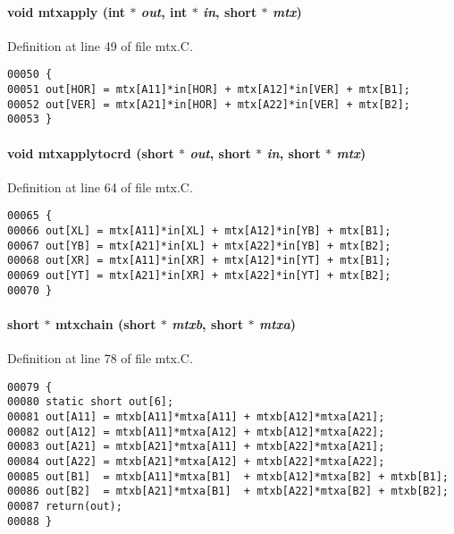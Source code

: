 \paragraph{\setlength{\rightskip}{0pt plus 5cm}void mtxapply (int $\ast$ {\em out}, int $\ast$ {\em in}, short $\ast$ {\em mtx})}\hfill



Definition at line 49 of file mtx.C.\small\begin{verbatim}00050 {
00051 out[HOR] = mtx[A11]*in[HOR] + mtx[A12]*in[VER] + mtx[B1];
00052 out[VER] = mtx[A21]*in[HOR] + mtx[A22]*in[VER] + mtx[B2];
00053 }
\end{verbatim}\normalsize 
\label{im.h_a7}
\paragraph{\setlength{\rightskip}{0pt plus 5cm}void mtxapplytocrd (short $\ast$ {\em out}, short $\ast$ {\em in}, short $\ast$ {\em mtx})}\hfill



Definition at line 64 of file mtx.C.\small\begin{verbatim}00065 {
00066 out[XL] = mtx[A11]*in[XL] + mtx[A12]*in[YB] + mtx[B1];
00067 out[YB] = mtx[A21]*in[XL] + mtx[A22]*in[YB] + mtx[B2];
00068 out[XR] = mtx[A11]*in[XR] + mtx[A12]*in[YT] + mtx[B1];
00069 out[YT] = mtx[A21]*in[XR] + mtx[A22]*in[YT] + mtx[B2];
00070 }
\end{verbatim}\normalsize 
\label{im.h_a8}
\paragraph{\setlength{\rightskip}{0pt plus 5cm}short $\ast$ mtxchain (short $\ast$ {\em mtxb}, short $\ast$ {\em mtxa})}\hfill



Definition at line 78 of file mtx.C.\small\begin{verbatim}00079 {
00080 static short out[6];
00081 out[A11] = mtxb[A11]*mtxa[A11] + mtxb[A12]*mtxa[A21];
00082 out[A12] = mtxb[A11]*mtxa[A12] + mtxb[A12]*mtxa[A22];
00083 out[A21] = mtxb[A21]*mtxa[A11] + mtxb[A22]*mtxa[A21];
00084 out[A22] = mtxb[A21]*mtxa[A12] + mtxb[A22]*mtxa[A22];
00085 out[B1]  = mtxb[A11]*mtxa[B1]  + mtxb[A12]*mtxa[B2] + mtxb[B1];
00086 out[B2]  = mtxb[A21]*mtxa[B1]  + mtxb[A22]*mtxa[B2] + mtxb[B2];
00087 return(out);
00088 }
\end{verbatim}\normalsize 
\label{im.h_a4}
